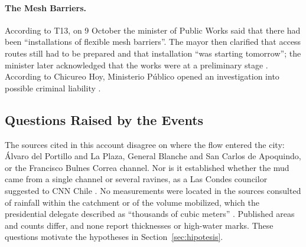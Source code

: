 \paragraph{The Mesh Barriers.} According to T13, on 9 October the minister of Public Works said that there had been ``installations of flexible mesh barriers''. The mayor then clarified that access routes still had to be prepared and that installation ``was starting tomorrow''; the minister later acknowledged that the works were at a preliminary stage \citep{t13_2026mallas}. According to Chicureo Hoy, Ministerio Público opened an investigation into possible criminal liability \citep{chicureohoy2026}.

\subsection*{Questions Raised by the Events}
The sources cited in this account disagree on where the flow entered the city: Álvaro del Portillo and La Plaza, General Blanche and San Carlos de Apoquindo, or the Francisco Bulnes Correa channel. Nor is it established whether the mud came from a single channel or several ravines, as a Las Condes councilor suggested to CNN Chile \citep{cnnchile2026haddad}. No measurements were located in the sources consulted of rainfall within the catchment or of the volume mobilized, which the presidential delegate described as ``thousands of cubic meters'' \citep{cooperativa2026alcaldesa}. Published areas and counts differ, and none report thicknesses or high-water marks. These questions motivate the hypotheses in Section~\ref{sec:hipotesis}.
